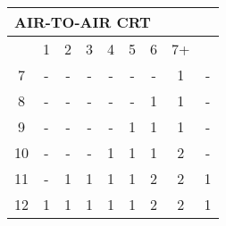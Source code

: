 

{\ttfamily
\begin{tabular}{|c|c|c|c|c|c|c|c|c|}
  \multicolumn{9}{l}{AIR-TO-AIR CRT} \\\hline
  \cline{2-8}
    & 1 & 2 & 3 & 4 & 5 & 6 & 7+ &  \\\hline
  7 & - & - & - & - & - & - & 1 & - \\
  8 & - & - & - & - & - & 1 & 1 & - \\
  9 & - & - & - & - & 1 & 1 & 1 & - \\
  10 & - & - & - & 1 & 1 & 1 & 2 & - \\
  \cline{7-8}
  11 & - & 1 & 1 & 1 & 1 & 2 & 2 & 1 \\
  \cline{5-6}
  12 & 1 & 1 & 1 & 1 & 1 & 2 & 2 & 1 \\\hline
\end{tabular} 
}

